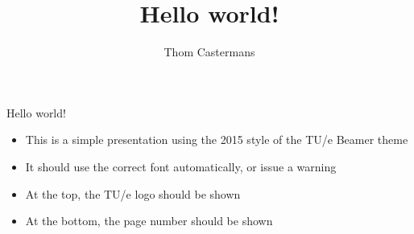 \documentclass[12pt, aspectratio=169]{beamer} %
\title{Hello world!}
\author{Thom Castermans}
\begin{document}
\begin{frame}{Hello world!}
  \begin{itemize}
    \item This is a simple presentation using the 2015 style of the TU/e Beamer theme
    \item It should use the correct font automatically, or issue a warning
    \item At the top, the TU/e logo should be shown
    \item At the bottom, the page number should be shown
  \end{itemize}
\end{frame}
\end{document}
